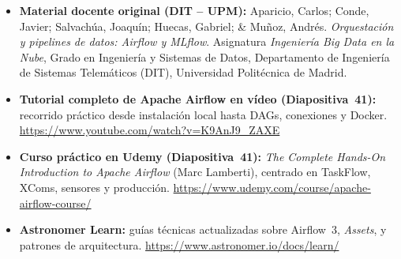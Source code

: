 {\small
\begin{itemize}[itemsep=2.5pt, topsep=3pt]
  \item \textbf{Material docente original (DIT -- UPM):} Aparicio, Carlos; Conde, Javier; Salvachúa, Joaquín; Huecas, Gabriel; \& Muñoz, Andrés. \textit{Orquestación y pipelines de datos: Airflow y MLflow}. Asignatura \textit{Ingeniería Big Data en la Nube}, Grado en Ingeniería y Sistemas de Datos, Departamento de Ingeniería de Sistemas Telemáticos (DIT), Universidad Politécnica de Madrid.

  \item \textbf{Tutorial completo de Apache Airflow en vídeo (Diapositiva~41):} recorrido práctico desde instalación local hasta DAGs, conexiones y Docker. \url{https://www.youtube.com/watch?v=K9AnJ9_ZAXE}

  \item \textbf{Curso práctico en Udemy (Diapositiva~41):} \textit{The Complete Hands-On Introduction to Apache Airflow} (Marc Lamberti), centrado en TaskFlow, XComs, sensores y producción. \url{https://www.udemy.com/course/apache-airflow-course/}

  \item \textbf{Astronomer Learn:} guías técnicas actualizadas sobre Airflow~3, \textit{Assets},  y patrones de arquitectura. \url{https://www.astronomer.io/docs/learn/}
\end{itemize}
}
